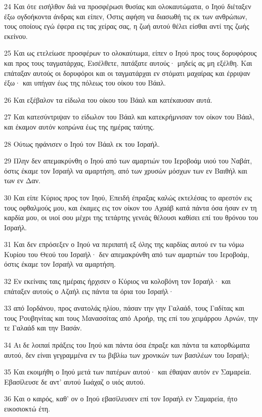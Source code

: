 \par 24 Και ότε εισήλθον διά να προσφέρωσι θυσίας και ολοκαυτώματα, ο Ιηού διέταξεν έξω ογδοήκοντα άνδρας και είπεν, Όστις αφήση να διασωθή τις εκ των ανθρώπων, τους οποίους εγώ έφερα εις τας χείρας σας, η ζωή αυτού θέλει είσθαι αντί της ζωής εκείνου.
\par 25 Και ως ετελείωσε προσφέρων το ολοκαύτωμα, είπεν ο Ιηού προς τους δορυφόρους και προς τους ταγματάρχας, Εισέλθετε, πατάξατε αυτούς· μηδείς ας μη εξέλθη. Και επάταξαν αυτούς οι δορυφόροι και οι ταγματάρχαι εν στόματι μαχαίρας και έρριψαν έξω· και υπήγαν έως της πόλεως του οίκου του Βάαλ.
\par 26 Και εξέβαλον τα είδωλα του οίκου του Βάαλ και κατέκαυσαν αυτά.
\par 27 Και κατεσύντριψαν το είδωλον του Βάαλ και κατεκρήμνισαν τον οίκον του Βάαλ, και έκαμον αυτόν κοπρώνα έως της ημέρας ταύτης.
\par 28 Ούτως ηφάνισεν ο Ιηού τον Βάαλ εκ του Ισραήλ.
\par 29 Πλην δεν απεμακρύνθη ο Ιηού από των αμαρτιών του Ιεροβοάμ υιού του Ναβάτ, όστις έκαμε τον Ισραήλ να αμαρτήση, από των χρυσών μόσχων των εν Βαιθήλ και των εν Δαν.
\par 30 Και είπε Κύριος προς τον Ιηού, Επειδή έπραξας καλώς εκτελέσας το αρεστόν εις τους οφθαλμούς μου, και έκαμες εις τον οίκον του Αχαάβ κατά πάντα όσα ήσαν εν τη καρδία μου, οι υιοί σου μέχρι της τετάρτης γενεάς θέλουσι καθίσει επί του θρόνου του Ισραήλ.
\par 31 Και δεν επρόσεξεν ο Ιηού να περιπατή εξ όλης της καρδίας αυτού εν τω νόμω Κυρίου του Θεού του Ισραήλ· δεν απεμακρύνθη από των αμαρτιών του Ιεροβοάμ, όστις έκαμε τον Ισραήλ να αμαρτήση.
\par 32 Εν εκείναις ταις ημέραις ήρχισεν ο Κύριος να κολοβόνη τον Ισραήλ· και επάταξεν αυτούς ο Αζαήλ εις πάντα τα όρια του Ισραήλ·
\par 33 από Ιορδάνου, προς ανατολάς ηλίου, πάσαν την γην Γαλαάδ, τους Γαδίτας και τους Ρουβηνίτας και τους Μανασσίτας από Αροήρ, της επί του χειμάρρου Αρνών, την τε Γαλαάδ και την Βασάν.
\par 34 Αι δε λοιπαί πράξεις του Ιηού και πάντα όσα έπραξε και πάντα τα κατορθώματα αυτού, δεν είναι γεγραμμένα εν τω βιβλίω των χρονικών των βασιλέων του Ισραήλ;
\par 35 Και εκοιμήθη ο Ιηού μετά των πατέρων αυτού· και έθαψαν αυτόν εν Σαμαρεία. Εβασίλευσε δε αντ' αυτού Ιωάχαζ ο υιός αυτού.
\par 36 Και ο καιρός, καθ' ον ο Ιηού εβασίλευσεν επί τον Ισραήλ εν Σαμαρεία, ήτο εικοσιοκτώ έτη.

